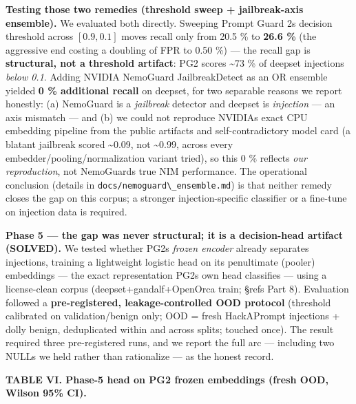 \textbf{Testing those two remedies (threshold sweep + jailbreak-axis
ensemble).} We evaluated both directly. Sweeping Prompt Guard
2\textquotesingle s decision threshold across \([0.9, 0.1]\) moves
recall only from 20.5 \% to \textbf{26.6 \%} (the aggressive end costing
a doubling of FPR to 0.50 \%) --- the recall gap is \textbf{structural,
not a threshold artifact}: PG2 scores \textasciitilde73 \% of deepset
injections \emph{below 0.1}. Adding NVIDIA NemoGuard JailbreakDetect as
an OR ensemble yielded \textbf{0 \% additional recall} on deepset, for
two separable reasons we report honestly: (a) NemoGuard is a
\emph{jailbreak} detector and deepset is \emph{injection} --- an axis
mismatch --- and (b) we could not reproduce NVIDIA\textquotesingle s
exact CPU embedding pipeline from the public artifacts and
self-contradictory model card (a blatant jailbreak scored
\textasciitilde0.09, not \textasciitilde0.99, across every
embedder/pooling/normalization variant tried), so this 0 \% reflects
\emph{our reproduction}, not NemoGuard\textquotesingle s true NIM
performance. The operational conclusion (details in
\passthrough{\lstinline!docs/nemoguard\_ensemble.md!}) is that neither
remedy closes the gap on this corpus; a stronger injection-specific
classifier or a fine-tune on injection data is required.

\textbf{Phase 5 --- the gap was never structural; it is a decision-head
artifact (SOLVED).} We tested whether PG2\textquotesingle s \emph{frozen
encoder} already separates injections, training a lightweight logistic
head on its penultimate (pooler) embeddings --- the exact representation
PG2\textquotesingle s own head classifies --- using a license-clean
corpus (deepset+gandalf+OpenOrca train; §refs Part 8). Evaluation
followed a \textbf{pre-registered, leakage-controlled OOD protocol}
(threshold calibrated on validation/benign only; OOD = fresh HackAPrompt
injections + dolly benign, deduplicated within and across splits;
touched once). The result required three pre-registered runs, and we
report the full arc --- including two NULLs we held rather than
rationalize --- as the honest record.

\textbf{TABLE VI. Phase-5 head on PG2 frozen embeddings (fresh OOD,
Wilson 95\% CI).}

